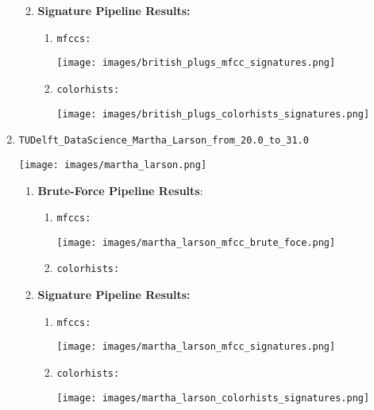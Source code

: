 \documentclass{article}
\begin{document}
\begin{enumerate}
\begin{enumerate}
\begin{enumerate}
\begin{center}
            \end{center} 
        \end{enumerate}
        \item \textbf{Signature Pipeline Results:} \begin{enumerate}
            \item \texttt{mfccs:} \begin{center}
                \texttt{[image: images/british\_plugs\_mfcc\_signatures.png]}
            \end{center}
            \item \texttt{colorhists:}\begin{center}
                \texttt{[image: images/british\_plugs\_colorhists\_signatures.png]}
            \end{center}
        \end{enumerate}
    \end{enumerate}
    \item\texttt{TUDelft\_DataScience\_Martha\_Larson\_from\_20.0\_to\_31.0} \begin{center}
            \texttt{[image: images/martha\_larson.png]}
    \end{center} \begin{enumerate}
        \item \textbf{Brute-Force Pipeline Results}: \begin{enumerate}
            \item \texttt{mfccs:}             \begin{center}
                \texttt{[image: images/martha\_larson\_mfcc\_brute\_foce.png]}
            \end{center}
            \item \texttt{colorhists:}
        \end{enumerate}
        
        \item \textbf{Signature Pipeline Results:} \begin{enumerate}
            \item \texttt{mfccs:}             \begin{center}
                \texttt{[image: images/martha\_larson\_mfcc\_signatures.png]}
            \end{center}
            \item \texttt{colorhists:}             \begin{center}
                \texttt{[image: images/martha\_larson\_colorhists\_signatures.png]}
            \end{center}
        \end{enumerate}
    \end{enumerate}
    

\end{enumerate}
\end{document}

